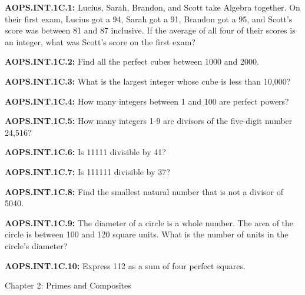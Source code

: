 \documentclass[11pt]{article}
\newenvironment{uzdevums}[1][\unskip]{%
\vspace{3mm}
\noindent
\textbf{#1:}
\noindent}
{}
\begin{document}
\begin{uzdevums}[AOPS.INT.1C.1]
Lucius, Sarah, Brandon, and Scott take Algebra together. On their first exam, Lucius got a 94, Sarah got a 91, Brandon got a 95, and Scott’s score was between 81 and 87 inclusive. If the average of all four of their scores is an integer, what was Scott’s score on the first exam?
\end{uzdevums}

\begin{uzdevums}[AOPS.INT.1C.2]
Find all the perfect cubes between 1000 and 2000.
\end{uzdevums}

\begin{uzdevums}[AOPS.INT.1C.3]
What is the largest integer whose cube is less than 10,000?
\end{uzdevums}

\begin{uzdevums}[AOPS.INT.1C.4]
How many integers between 1 and 100 are perfect powers?
\end{uzdevums}

\begin{uzdevums}[AOPS.INT.1C.5]
How many integers 1-9 are divisors of the five-digit number 24,516?
\end{uzdevums}

\begin{uzdevums}[AOPS.INT.1C.6]
Is 11111 divisible by 41?
\end{uzdevums}

\begin{uzdevums}[AOPS.INT.1C.7]
Is 111111 divisible by 37?
\end{uzdevums}

\begin{uzdevums}[AOPS.INT.1C.8]
Find the smallest natural number that is not a divisor of 5040.
\end{uzdevums}

\begin{uzdevums}[AOPS.INT.1C.9]
The diameter of a circle is a whole number. The area of the circle is between 100 and 120 square units. What is the number of units in the circle’s diameter?
\end{uzdevums}

\begin{uzdevums}[AOPS.INT.1C.10]
Express 112 as a sum of four perfect squares.
\end{uzdevums}


\vspace{30px}
\begin{center}
{\large Chapter 2: Primes and Composites}
\end{center}
\end{document}
